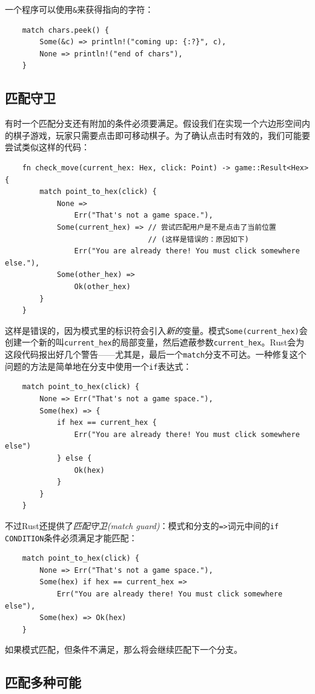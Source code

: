 一个程序可以使用\texttt{\&}来获得指向的字符：
\begin{verbatim}
    match chars.peek() {
        Some(&c) => println!("coming up: {:?}", c),
        None => println!("end of chars"),
    }
\end{verbatim}

\subsection{匹配守卫}
有时一个匹配分支还有附加的条件必须要满足。假设我们在实现一个六边形空间内的棋子游戏，玩家只需要点击即可移动棋子。为了确认点击时有效的，我们可能要尝试类似这样的代码：
\begin{verbatim}
    fn check_move(current_hex: Hex, click: Point) -> game::Result<Hex> {
        match point_to_hex(click) {
            None =>
                Err("That's not a game space."),
            Some(current_hex) => // 尝试匹配用户是不是点击了当前位置
                                 // (这样是错误的：原因如下)
                Err("You are already there! You must click somewhere else."),
            Some(other_hex) =>
                Ok(other_hex)
        }
    }
\end{verbatim}

这样是错误的，因为模式里的标识符会引入\emph{新的}变量。模式\texttt{Some(current\_hex)}会创建一个新的叫\texttt{current\_hex}的局部变量，然后遮蔽参数\texttt{current\_hex}。Rust会为这段代码报出好几个警告——尤其是，最后一个\texttt{match}分支不可达。一种修复这个问题的方法是简单地在分支中使用一个\texttt{if}表达式：
\begin{verbatim}
    match point_to_hex(click) {
        None => Err("That's not a game space."),
        Some(hex) => {
            if hex == current_hex {
                Err("You are already there! You must click somewhere else")
            } else {
                Ok(hex)
            }
        }
    }
\end{verbatim}

不过Rust还提供了\emph{匹配守卫(match guard)}：模式和分支的\texttt{=>}词元中间的\texttt{if CONDITION}条件必须满足才能匹配：
\begin{verbatim}
    match point_to_hex(click) {
        None => Err("That's not a game space."),
        Some(hex) if hex == current_hex =>
            Err("You are already there! You must click somewhere else"),
        Some(hex) => Ok(hex)
    }
\end{verbatim}

如果模式匹配，但条件不满足，那么将会继续匹配下一个分支。

\subsection{匹配多种可能}



